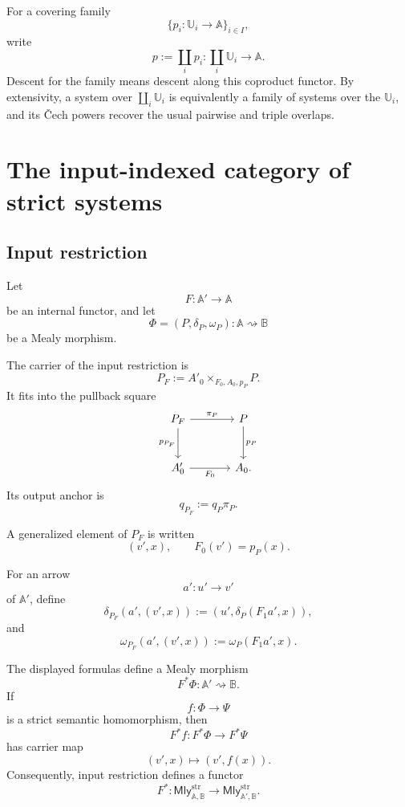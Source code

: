 For a covering family
\[
    \{p_i:\mathbb U_i\to\mathbb A\}_{i\in I},
\]
write
\[
    p:=\coprod_i p_i:
    \coprod_i\mathbb U_i\to\mathbb A.
\]
Descent for the family means descent along this coproduct functor. By
extensivity, a system over \(\coprod_i\mathbb U_i\) is equivalently a family
of systems over the \(\mathbb U_i\), and its Čech powers recover the usual
pairwise and triple overlaps.

\section{The input-indexed category of strict systems}
\label{sec:input-indexed-strict-systems}

\subsection{Input restriction}
\label{subsec:input-pullback-strict-systems}

Let
\[
    F:\mathbb A'\to\mathbb A
\]
be an internal functor, and let
\[
    \Phi=(P,\delta_P,\omega_P):
    \mathbb A\rightsquigarrow\mathbb B
\]
be a Mealy morphism.

The carrier of the input restriction is
\[
    P_F
    :=
    A'_0\times_{F_0,A_0,p_P}P.
\]
It fits into the pullback square
\[
\begin{tikzcd}[column sep=large,row sep=large]
    P_F
        \arrow[r, "\pi_P"]
        \arrow[d, "p_{P_F}"']
    &
    P
        \arrow[d, "p_P"]
    \\
    A'_0
        \arrow[r, "F_0"']
    &
    A_0.
\end{tikzcd}
\]
Its output anchor is
\[
    q_{P_F}:=q_P\pi_P.
\]

A generalized element of \(P_F\) is written
\[
    (v',x),
    \qquad
    F_0(v')=p_P(x).
\]

For an arrow
\[
    a':u'\to v'
\]
of \(\mathbb A'\), define
\[
    \delta_{P_F}(a',(v',x))
    :=
    \left(
        u',
        \delta_P(F_1a',x)
    \right),
\]
and
\[
    \omega_{P_F}(a',(v',x))
    :=
    \omega_P(F_1a',x).
\]

\begin{proposition}
\label{prop:input-pullback-strict-mealy}
The displayed formulas define a Mealy morphism
\[
    F^\ast\Phi:
    \mathbb A'\rightsquigarrow\mathbb B.
\]
If
\[
    f:\Phi\to\Psi
\]
is a strict semantic homomorphism, then
\[
    F^\ast f:
    F^\ast\Phi\to F^\ast\Psi
\]
has carrier map
\[
    (v',x)\longmapsto(v',f(x)).
\]
Consequently, input restriction defines a functor
\[
    F^\ast:
    \mathsf{Mly}^{\mathrm{str}}_{\mathbb A,\mathbb B}
    \to
    \mathsf{Mly}^{\mathrm{str}}_{\mathbb A',\mathbb B}.
\]
\end{proposition}

